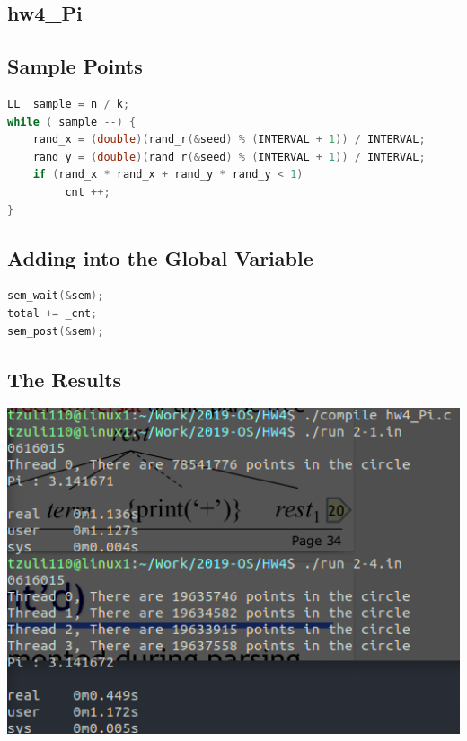 \documentclass[12pt, a4paper]{article}
\begin{document}
\begin{CJK*}{UTF8}{bsmi}
    \section{hw4\_Pi}

        \subsection{Sample Points}

\begin{lstlisting}[language=C++]
LL _sample = n / k;
while (_sample --) {
    rand_x = (double)(rand_r(&seed) % (INTERVAL + 1)) / INTERVAL;
    rand_y = (double)(rand_r(&seed) % (INTERVAL + 1)) / INTERVAL;
    if (rand_x * rand_x + rand_y * rand_y < 1)
        _cnt ++;
}
\end{lstlisting}

        \subsection{Adding into the Global Variable}
\begin{lstlisting}[language=C++]
sem_wait(&sem);
total += _cnt;
sem_post(&sem);
\end{lstlisting}

        \subsection{The Results}
            \includegraphics[width=15cm]{pi.png}


    \end{CJK*}
\end{document}
